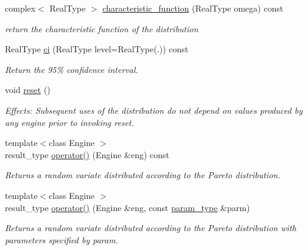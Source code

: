 \begin{DoxyCompactItemize}
\mbox{\label{classpareto__distribution_acef7b13822b8ea6489c01d43bb71caf9}} 
complex$<$ Real\+Type $>$ \mbox{\hyperlink{classpareto__distribution_acef7b13822b8ea6489c01d43bb71caf9}{characteristic\+\_\+function}} (Real\+Type omega) const
\begin{DoxyCompactList}\small\item\em return the characteristic function of the distribution \end{DoxyCompactList}\item 
\mbox{\label{classpareto__distribution_a0ab5bbfc1834d4184db153a5803922eb}} 
Real\+Type \mbox{\hyperlink{classpareto__distribution_a0ab5bbfc1834d4184db153a5803922eb}{ci}} (Real\+Type level=Real\+Type(.)) const
\begin{DoxyCompactList}\small\item\em Return the 95\% confidence interval. \end{DoxyCompactList}\item 
\mbox{\label{classpareto__distribution_afaf787428998d91ac739d2a5356f3e20}} 
void \mbox{\hyperlink{classpareto__distribution_afaf787428998d91ac739d2a5356f3e20}{reset}} ()
\begin{DoxyCompactList}\small\item\em Effects\+: Subsequent uses of the distribution do not depend on values produced by any engine prior to invoking reset. \end{DoxyCompactList}\item 
\mbox{\label{classpareto__distribution_ad711d059b455b643767fb9e907595d67}} 
{\footnotesize template$<$class Engine $>$ }\\result\+\_\+type \mbox{\hyperlink{classpareto__distribution_ad711d059b455b643767fb9e907595d67}{operator()}} (Engine \&eng) const
\begin{DoxyCompactList}\small\item\em Returns a random variate distributed according to the Pareto distribution. \end{DoxyCompactList}\item 
\mbox{\label{classpareto__distribution_a627683402f68bba682621994612d9f28}} 
{\footnotesize template$<$class Engine $>$ }\\result\+\_\+type \mbox{\hyperlink{classpareto__distribution_a627683402f68bba682621994612d9f28}{operator()}} (Engine \&eng, const \mbox{\hyperlink{classpareto__distribution_1_1param__type}{param\+\_\+type}} \&parm)
\begin{DoxyCompactList}\small\item\em Returns a random variate distributed according to the Pareto distribution with parameters specified by param. \end{DoxyCompactList}\end{DoxyCompactItemize}
